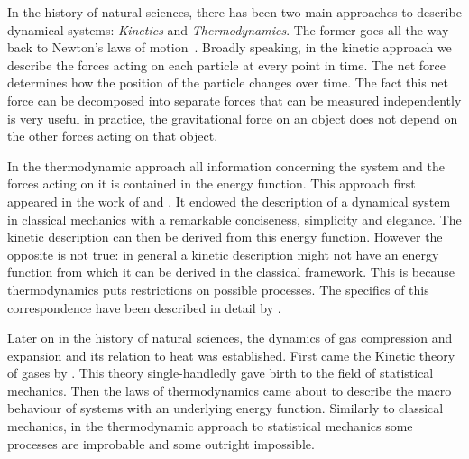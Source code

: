 % 
In the history of natural sciences,
there has been two main approaches to describe dynamical systems:
\emph{Kinetics} and \emph{Thermodynamics}.
The former goes all the way back to
Newton's laws of motion~\citep{newton}.
Broadly speaking, in the kinetic approach we describe the forces
acting on each particle at every point in time.
The net force determines how
the position of the particle changes over time.
The fact this net force can be decomposed into separate forces
that can be measured independently is very useful in practice,
\eg the gravitational force on an object does not depend on
the other forces acting on that object.

In the thermodynamic approach
all information concerning the system and the forces acting on it
is contained in the energy function.
This approach first appeared in the work of
\citet{lagrange2} and \citet{hamilton}.
It endowed the description of a dynamical system in classical mechanics
with a remarkable conciseness, simplicity and elegance.
The kinetic description can then be derived from this energy function.
However the opposite is not true:
in general a kinetic description might not have an energy function
from which it can be derived in the classical framework.
This is because thermodynamics puts restrictions on possible processes.
The specifics of this correspondence have been described
in detail by . %

Later on in the history of natural sciences,
the dynamics of gas compression and expansion
and its relation to heat was established.
First came the Kinetic theory of gases by . %
This theory single-handledly gave birth to
the field of statistical mechanics. %
Then the laws of thermodynamics came about
to describe the macro behaviour of systems
with an underlying energy function. %
Similarly to classical mechanics,
in the thermodynamic approach to statistical mechanics
some processes are improbable and some outright impossible.

